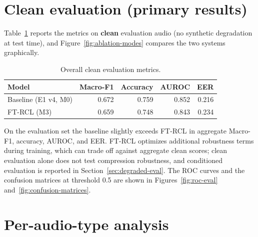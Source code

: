 \section{Clean evaluation (primary results)}
\label{sec:clean-eval-primary}

Table~\ref{tab:overall-p30} reports the metrics on \textbf{clean} evaluation audio (no synthetic degradation at test time), and Figure~\ref{fig:ablation-modes} compares the two systems graphically.

\begin{table}[htbp]
\centering
\caption{Overall clean evaluation metrics.}
\label{tab:overall-p30}
\begin{tabular}{@{}lrrrr@{}}
\toprule
Model & Macro-F1 & Accuracy & AUROC & EER \\
\midrule
Baseline (E1 v4, M0) & 0.672 & 0.759 & 0.852 & 0.216 \\
FT-RCL (M3)          & 0.659 & 0.748 & 0.843 & 0.234 \\
\bottomrule
\end{tabular}
\end{table}

On the evaluation set the baseline slightly exceeds FT-RCL in aggregate Macro-F1, accuracy, AUROC, and EER. FT-RCL optimizes additional robustness terms during training, which can trade off against aggregate clean scores; clean evaluation alone does not test compression robustness, and conditioned evaluation is reported in Section~\ref{sec:degraded-eval}. The ROC curves and the confusion matrices at threshold 0.5 are shown in Figures~\ref{fig:roc-eval} and~\ref{fig:confusion-matrices}.




\section{Per-audio-type analysis}

